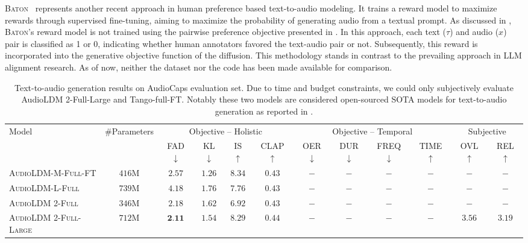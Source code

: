 \textsc{Baton}~\cite{liao2024baton} represents another recent approach in human preference based text-to-audio modeling. It trains a reward model to maximize rewards through supervised fine-tuning, aiming to maximize the probability of generating audio from a textual prompt. As discussed in , \textsc{Baton}'s reward model is not trained using the pairwise preference objective presented in . In this approach, each text ($\tau$) and audio ($x$) pair is classified as 1 or 0, indicating whether human annotators favored the text-audio pair or not. Subsequently, this reward is incorporated into the generative objective function of the diffusion. This methodology stands in contrast to the prevailing approach in LLM alignment research. As of now, neither the dataset nor the code has been made available for comparison.
\begin{table*}[t]
\centering
\caption{Text-to-audio generation results on AudioCaps evaluation set. Due to time and budget constraints, we could only subjectively evaluate AudioLDM 2-Full-Large and Tango-full-FT. Notably these two models are considered open-sourced SOTA models for text-to-audio generation as reported in \cite{vyas2023audiobox}.}

\begin{tabular}{l|c|cccc|cccc|cc}
\toprule
\multirow{2}{*}{Model} & \multirow{2}{*}{\#Parameters} & \multicolumn{4}{c|}{Objective -- Holistic} & \multicolumn{4}{c|}{Objective -- Temporal} & \multicolumn{2}{c}{Subjective} \\
&  & FAD $\downarrow$ &  KL $\downarrow$ & IS $\uparrow$ & CLAP $\uparrow$ & OER $\downarrow$ & DUR $\downarrow$ & FREQ $\downarrow$ & TIME $\uparrow$ & OVL $\uparrow$ & REL $\uparrow$  \\
\midrule
\textsc{AudioLDM-M-Full-FT}  & $416$M  & $2.57$  & $1.26$ &  $8.34$ & $0.43$
 & $-$ & $-$ & $-$ & $-$ & $-$ & $-$\\
\textsc{AudioLDM-L-Full}  & $739$M  & $4.18$  & $1.76$ &  $7.76$ & $0.43$
 & $-$ & $-$ & $-$ & $-$ &$-$ & $-$\\
\midrule

\textsc{AudioLDM 2-Full} & $346$M & \textbf{$2.18$} & $1.62$ & $6.92$ & $0.43$  & $-$ & $-$ & $-$ & $-$ & $-$ & $-$  \\
\textsc{AudioLDM 2-Full-Large}  &  $712$M & $\textbf{2.11}$ & $1.54$ & $8.29$ & $0.44$  & $-$ & $-$ & $-$ & $-$ & $3.56$ & $3.19$  \\

\midrule


\end{tabular}
\end{table*}
